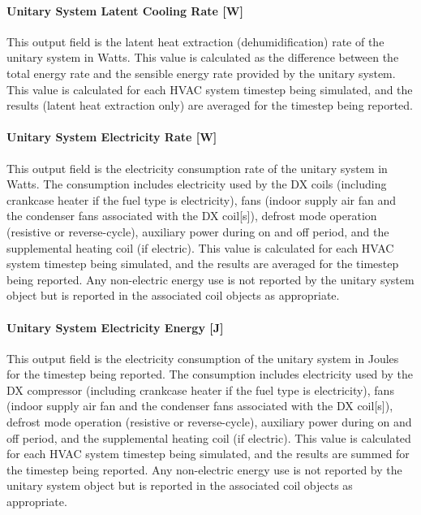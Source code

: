 \paragraph{Unitary System Latent Cooling Rate {[}W{]}}\label{unitary-system-latent-cooling-rate-w}

This output field is the latent heat extraction (dehumidification) rate of the unitary system in Watts. This value is calculated as the difference between the total energy rate and the sensible energy rate provided by the unitary system. This value is calculated for each HVAC system timestep being simulated, and the results (latent heat extraction only) are averaged for the timestep being reported.

\paragraph{Unitary System Electricity Rate {[}W{]}}\label{unitary-system-electric-power-w}

This output field is the electricity consumption rate of the unitary system in Watts. The consumption includes electricity used by the DX coils (including crankcase heater if the fuel type is electricity), fans (indoor supply air fan and the condenser fans associated with the DX coil{[}s{]}), defrost mode operation (resistive or reverse-cycle), auxiliary power during on and off period, and the supplemental heating coil (if electric). This value is calculated for each HVAC system timestep being simulated, and the results are averaged for the timestep being reported. Any non-electric energy use is not reported by the unitary system object but is reported in the associated coil objects as appropriate.

\paragraph{Unitary System Electricity Energy {[}J{]}}\label{unitary-system-electric-energy-j}

This output field is the electricity consumption of the unitary system in Joules for the timestep being reported. The consumption includes electricity used by the DX compressor (including crankcase heater if the fuel type is electricity), fans (indoor supply air fan and the condenser fans associated with the DX coil{[}s{]}), defrost mode operation (resistive or reverse-cycle), auxiliary power during on and off period, and the supplemental heating coil (if electric). This value is calculated for each HVAC system timestep being simulated, and the results are summed for the timestep being reported. Any non-electric energy use is not reported by the unitary system object but is reported in the associated coil objects as appropriate.

